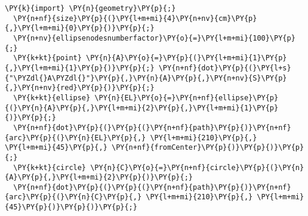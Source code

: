 \begin{Verbatim}[commandchars=\\\{\}]
  \PY{k}{import} \PY{n}{geometry}\PY{p}{;}
  \PY{n+nf}{size}\PY{p}{(}\PY{l+m+mi}{4}\PY{n+nv}{cm}\PY{p}{,}\PY{l+m+mi}{0}\PY{p}{)}\PY{p}{;}
  \PY{n+nv}{ellipsenodesnumberfactor}\PY{o}{=}\PY{l+m+mi}{100}\PY{p}{;}
  \PY{k+kt}{point} \PY{n}{A}\PY{o}{=}\PY{p}{(}\PY{l+m+mi}{1}\PY{p}{,}\PY{l+m+mi}{1}\PY{p}{)}\PY{p}{;} \PY{n+nf}{dot}\PY{p}{(}\PY{l+s}{"\PYZdl{}A\PYZdl{}"}\PY{p}{,}\PY{n}{A}\PY{p}{,}\PY{n+nv}{S}\PY{p}{,}\PY{n+nv}{red}\PY{p}{)}\PY{p}{;}
  \PY{k+kt}{ellipse} \PY{n}{EL}\PY{o}{=}\PY{n+nf}{ellipse}\PY{p}{(}\PY{n}{A}\PY{p}{,}\PY{l+m+mi}{2}\PY{p}{,}\PY{l+m+mi}{1}\PY{p}{)}\PY{p}{;}
  \PY{n+nf}{dot}\PY{p}{(}\PY{p}{(}\PY{n+nf}{path}\PY{p}{)}\PY{n+nf}{arc}\PY{p}{(}\PY{n}{EL}\PY{p}{,} \PY{l+m+mi}{210}\PY{p}{,} \PY{l+m+mi}{45}\PY{p}{,} \PY{n+nf}{fromCenter}\PY{p}{)}\PY{p}{)}\PY{p}{;}
  \PY{k+kt}{circle} \PY{n}{C}\PY{o}{=}\PY{n+nf}{circle}\PY{p}{(}\PY{n}{A}\PY{p}{,}\PY{l+m+mi}{2}\PY{p}{)}\PY{p}{;}
  \PY{n+nf}{dot}\PY{p}{(}\PY{p}{(}\PY{n+nf}{path}\PY{p}{)}\PY{n+nf}{arc}\PY{p}{(}\PY{n}{C}\PY{p}{,} \PY{l+m+mi}{210}\PY{p}{,} \PY{l+m+mi}{45}\PY{p}{)}\PY{p}{)}\PY{p}{;}
\end{Verbatim}
